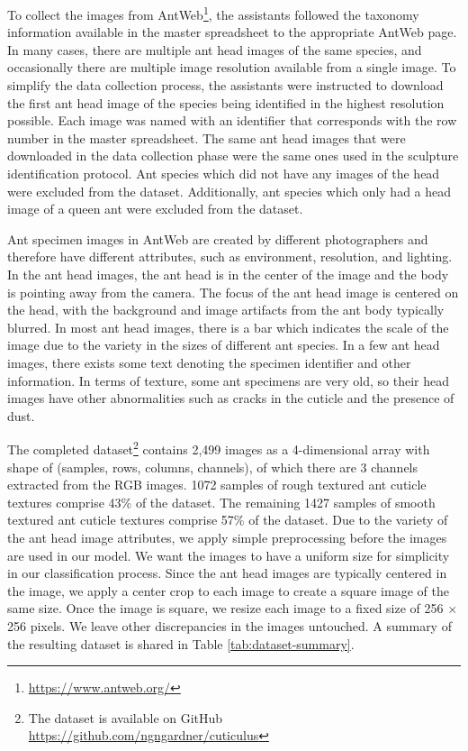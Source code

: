 \documentclass{aci}
\numberwithin{equation}{section}
\begin{document}
To collect the images from AntWeb\footnote{\url{https://www.antweb.org/}}, the
assistants followed the taxonomy information available in the master spreadsheet
to the appropriate AntWeb page. In many cases, there are multiple ant head
images of the same species, and occasionally there are multiple image resolution
available from a single image. To simplify the data collection process, the
assistants were instructed to download the first ant head image of the species
being identified in the highest resolution possible. Each image was named with
an identifier that corresponds with the row number in the master spreadsheet.
The same ant head images that were downloaded in the data collection phase were
the same ones used in the sculpture identification protocol. Ant species which
did not have any images of the head were excluded from the dataset.
Additionally, ant species which only had a head image of a queen ant were
excluded from the dataset.

Ant specimen images in AntWeb \cite{perrichot_antweb_2012} are created by
different photographers and therefore have different attributes, such as
environment, resolution, and lighting. In the ant head images, the ant head is
in the center of the image and the body is pointing away from the camera. The
focus of the ant head image is centered on the head, with the background and
image artifacts from the ant body typically blurred. In most ant head images,
there is a bar which indicates the scale of the image due to the variety in the
sizes of different ant species. In a few ant head images, there exists some text
denoting the specimen identifier and other information. In terms of texture,
some ant specimens are very old, so their head images have other abnormalities
such as cracks in the cuticle and the presence of dust.

The completed dataset\footnote{The dataset is available on GitHub
    \url{https://github.com/ngngardner/cuticulus}} contains 2,499 images as a
4-dimensional array with shape of (samples, rows, columns, channels), of
which there are 3 channels extracted from the RGB images. 1072 samples of
rough textured ant cuticle textures comprise 43\% of the dataset. The
remaining 1427 samples of smooth textured ant cuticle textures comprise 57\%
of the dataset. Due to the variety of the ant head image attributes, we
apply simple preprocessing before the images are used in our model. We want
the images to have a uniform size for simplicity in our classification
process. Since the ant head images are typically centered in the image, we
apply a center crop to each image to create a square image of the same size.
Once the image is square, we resize each image to a fixed size of 256 $\times$ 256
pixels. We leave other discrepancies in the images untouched. A summary of
the resulting dataset is shared in Table \ref{tab:dataset-summary}.
\end{document}
